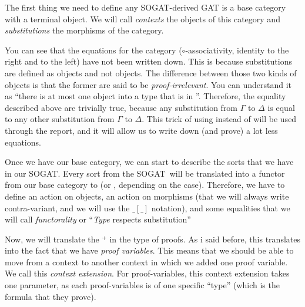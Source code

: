 \documentclass[10pt,a4paper]{article}
\begin{document}
			The first thing we need to define any SOGAT-derived GAT is a base category with a terminal object. We will call \emph{contexts} the objects of this category and \emph{substitutions} the morphisms of the category.
			
			You can see that the equations for the category ($\circ$-associativity, identity to the right and to the left) have not been written down. This is because substitutions are defined as \Prop{} objects and not \Set objects. The difference between those two kinds of objects is that the former are said to be \emph{proof-irrelevant}. You can understand it as \enquote{there is at most one object into a type that is in \Prop}. Therefore, the equality described above are trivially true, because any substitution from $\Gamma$ to $\Delta$ is equal to any other substitution from $\Gamma$ to $\Delta$. This trick of using \Prop{} instead of \Set{} will be used through the report, and it will allow us to write down (and prove) a lot less equations.
			
			\begin{tcolorbox}
			\end{tcolorbox}
		
			Once we have our base category, we can start to describe the sorts that we have in our SOGAT. Every sort from the SOGAT will be translated into a functor from our base category to \Set{} (or \Prop{}, depending on the case). Therefore, we have to define an action on objects, an action on morphisms (that we will always write contra-variant, and we will use the $\_[\_]$ notation), and some equalities that we will call \emph{functorality} or \enquote{\textit{Type} respects substitution}
			
			\begin{tcolorbox}
				\agda{agda/ZOL-3.tex}
				\agdasep
				\agda{agda/ZOL-4.tex}
			\end{tcolorbox}
		
			Now, we will translate the ${}^+$ in the type of proofs. As i said before, this translates into the fact that we have \emph{proof variables}. This means that we should be able to move from a context to another context in which we added one proof variable. We call this \emph{context extension}. For proof-variables, this context extension takes one parameter, as each proof-variables is of one specific \enquote{type} (which is the formula that they prove).
			
\end{document}
